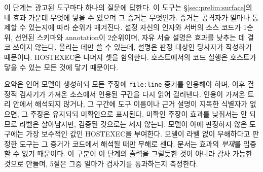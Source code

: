 \documentclass[acmsmall,screen,review,anonymous]{acmart}
\begin{document}
이 단계는 광고된 도구마다 하나의 질문에 답한다. 이 도구는 \S\ref{sec:prelim:surface}의 네 효과 가운데 무엇에 닿을 수 있으며 그 증거는 무엇인가. 증거는 공격자가 얼마나 통제할 수 있는지에 따라 순위가 매겨진다. 설정 자신의 인자와 서버의 소스 코드가 1순위, 선언된 스키마와 annotation이 2순위이며, 자유 서술 설명은 효과를 낮추는 데 결코 쓰이지 않는다. 올리는 데만 쓸 수 있는데, 설명은 판정 대상인 당사자가 작성하기 때문이다. HOSTEXEC은 나머지 셋을 함의한다. 호스트에서의 코드 실행은 호스트가 닿을 수 있는 모든 것에 닿기 때문이다.

요약은 언어 모델이 생성하되 모든 주장에 \texttt{file:line} 증거를 인용해야 하며, 이후 결정적 검사기가 가져온 소스에서 인용된 구간을 다시 읽어 걸러낸다. 인용이 가져온 트리 안에서 해석되지 않거나, 그 구간에 도구 이름이나 근거 설명이 지목한 식별자가 없으면, 그 주장은 유지되되 미확인으로 표시된다. 미확인 주장이 효과를 낮춰서는 안 되므로 라벨은 살아남지만, 검증된 것으로는 세지 않는다. 모델이 아예 판정하지 않은 도구에는 가장 보수적인 값인 HOSTEXEC을 부여한다. 모델이 라벨 없이 무해하다고 판정한 도구는 그 증거가 코드에서 해석될 때만 무해로 센다. 문서는 효과의 \emph{부재}를 입증할 수 없기 때문이다. 이 구분이 이 단계의 출력을 그럴듯한 것이 아니라 감사 가능한 것으로 만들며, 5절은 그중 얼마가 검사기를 통과하는지 측정한다.
\end{document}

